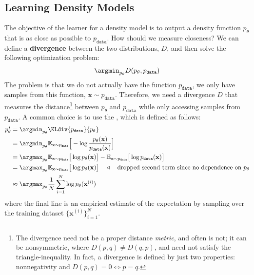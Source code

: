 \subsection{Learning Density Models}
The objective of the learner for a density model is to output a density function $p_{\theta}$ that is as close as possible to $p_{\texttt{data}}$. How should we measure closeness? We can define a {\bf divergence} between the two distributions, $D$, and then solve the following optimization problem:
\begin{equation}
    \argmin_{p_\theta} D(p_{\theta}, p_{\texttt{data}})
\end{equation}
The problem is that we do not actually have the function $p_{\texttt{data}}$, we only have samples from this function, $\mathbf{x} \sim p_{\texttt{data}}$. Therefore, we need a divergence $D$ that measures the distance\footnote{The divergence need not be a proper distance \emph{metric}, and often is not; it can be nonsymmetric, where $D(p,q) \neq D(q,p)$, and need not satisfy the triangle-inequality. In fact, a divergence is defined by just two properties: nonnegativity and $D(p,q) = 0 \iff p=q$.} between $p_{\theta}$ and $p_{\texttt{data}}$ while only accessing samples from $p_{\texttt{data}}$. A common choice is to use the , which is defined as follows:
\begin{align}
    p_{\theta}^* &= \argmin_{p_\theta} \KLdiv{p_{\texttt{data}}}{p_{\theta}}\\
    &= \argmin_{p_\theta} \mathbb{E}_{\mathbf{x} \sim p_{\texttt{data}}}\Big[-\log \frac{p_{\theta}(\mathbf{x})}{p_{\texttt{data}}(\mathbf{x})}\Big]\\
    &= \argmax_{p_\theta} \mathbb{E}_{\mathbf{x} \sim p_{\texttt{data}}}\big[\log p_{\theta}(\mathbf{x})\big] - \mathbb{E}_{\mathbf{x} \sim p_{\texttt{data}}}\big[\log p_{\texttt{data}}(\mathbf{x})\big]\\
    &= \argmax_{p_\theta} \mathbb{E}_{\mathbf{x} \sim p_{\texttt{data}}}\big[\log p_{\theta}(\mathbf{x})\big] \quad \triangleleft \quad\text{dropped second term since no dependence on $p_{\theta}$}
    \label{eqn:generative_models:max_likelihood}\\
    &\approx \argmax_{p_\theta} \frac{1}{N} \sum_{i=1}^N \log p_{\theta}(\mathbf{x}^{(i)})
\end{align}
where the final line is an empirical estimate of the expectation by sampling over the training dataset $\{\mathbf{x}^{(i)}\}_{i=1}^N$. 
